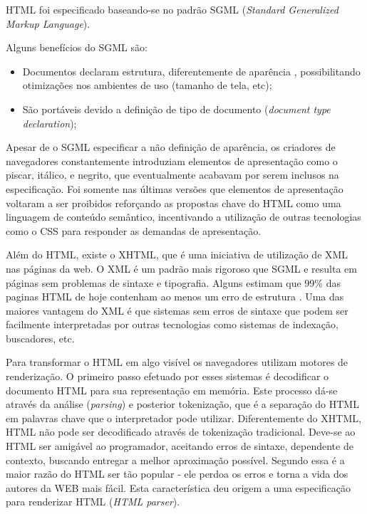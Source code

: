 HTML foi especificado baseando-se no padrão SGML (\textit{Standard Generalized
Markup Language}).

Alguns benefícios do SGML são:
\begin{itemize}
    \item Documentos declaram estrutura, diferentemente de aparência
, possibilitando otimizações nos ambientes de uso (tamanho de tela,
etc);
    \item São portáveis devido a definição de tipo de documento
(\textit{document type declaration});
\end{itemize}

Apesar de o SGML especificar a não definição de aparência, os criadores de
navegadores constantemente introduziam elementos de apresentação como o
piscar, itálico, e negrito, que eventualmente acabavam por serem inclusos
na especificação. Foi somente nas últimas versões que elementos de
apresentação voltaram a ser proibidos reforçando as propostas chave
do HTML como uma linguagem de conteúdo semântico, incentivando a
utilização de outras tecnologias como o CSS para responder as demandas de
apresentação.

Além do HTML, existe o XHTML, que é uma iniciativa de utilização de
XML nas páginas da web. O XML é um padrão mais rigoroso que SGML e
resulta em páginas sem problemas de sintaxe e tipografia. 
Alguns estimam que 99\% das paginas HTML de hoje
contenham ao menos um erro de estrutura \autocite{diveIntohtml}.
Uma das maiores vantagem do XML é que sistemas sem erros de sintaxe
que podem ser facilmente interpretadas por outras tecnologias como
sistemas de indexação, buscadores, etc.

Para transformar o HTML em algo visível os navegadores utilizam motores
de renderização. O primeiro passo efetuado por esses sistemas é
decodificar o documento HTML para sua representação em memória. Este
processo dá-se através da análise (\textit{parsing}) e posterior
tokenização, que é a separação do HTML em palavras chave que o
interpretador pode utilizar. Diferentemente do XHTML, HTML não pode
ser decodificado através de tokenização tradicional. Deve-se ao HTML
ser amigável ao programador, aceitando erros de sintaxe, dependente
de contexto, buscando entregar a melhor aproximação possível. 
Segundo \cite{howBrowsersWork} essa é a maior razão do HTML ser tão popular - 
ele perdoa os erros e torna a vida dos autores da WEB mais fácil. Esta
característica deu origem a uma especificação para renderizar HTML
(\textit{HTML parser}).

